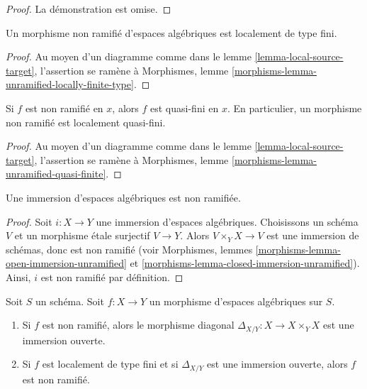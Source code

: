 \begin{proof}
La démonstration est omise.
\end{proof}


\begin{lemma}
\label{lemma-unramified-locally-finite-type}
Un morphisme non ramifié d'espaces algébriques est localement de type fini.
\end{lemma}

\begin{proof}
Au moyen d'un diagramme comme dans le
lemme \ref{lemma-local-source-target},
l'assertion se ramène à
Morphismes, lemme \ref{morphisms-lemma-unramified-locally-finite-type}.
\end{proof}

\begin{lemma}
\label{lemma-unramified-quasi-finite}
Si $f$ est non ramifié en $x$, alors $f$ est quasi-fini en $x$.
En particulier, un morphisme non ramifié est localement quasi-fini.
\end{lemma}

\begin{proof}
Au moyen d'un diagramme comme dans le
lemme \ref{lemma-local-source-target},
l'assertion se ramène à
Morphismes, lemme \ref{morphisms-lemma-unramified-quasi-finite}.
\end{proof}

\begin{lemma}
\label{lemma-immersion-unramified}
Une immersion d'espaces algébriques est non ramifiée.
\end{lemma}

\begin{proof}
Soit $i : X \to Y$ une immersion d'espaces algébriques. Choisissons un schéma
$V$ et un morphisme étale surjectif $V \to Y$. Alors $V \times_Y X \to V$
est une immersion de schémas, donc est non ramifié (voir
Morphismes, lemmes \ref{morphisms-lemma-open-immersion-unramified} et
\ref{morphisms-lemma-closed-immersion-unramified}).
Ainsi, $i$ est non ramifié par définition.
\end{proof}

\begin{lemma}
\label{lemma-diagonal-unramified-morphism}
Soit $S$ un schéma.
Soit $f : X \to Y$ un morphisme d'espaces algébriques sur $S$.
\begin{enumerate}
\item Si $f$ est non ramifié, alors le morphisme diagonal
$\Delta_{X/Y} : X \to X \times_Y X$ est une immersion ouverte.
\item Si $f$ est localement de type fini
et si $\Delta_{X/Y}$ est une immersion ouverte, alors $f$ est non ramifié.
\end{enumerate}
\end{lemma}

